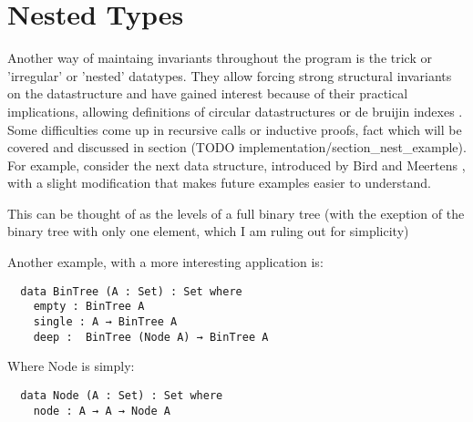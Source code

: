 \documentclass[12pt,twoside,notitlepage]{report}
\newcommand{\Conid}[1]{\mathit{#1}}
\newcommand{\Varid}[1]{\mathit{#1}}
\def\resethooks{%
  \global\let\SaveRestoreHook\empty
  \global\let\ColumnHook\empty}
\newcommand{\hsindent}[1]{\quad}%
\let\hspre\empty
\let\hspost\empty
\begin{document}
\section{Nested Types}

Another way of maintaing invariants throughout the program is the trick or 'irregular'
or 'nested' datatypes. They allow forcing strong structural invariants on the datastructure
and have gained interest because of their practical implications, allowing definitions of
circular datastructures \cite{circular} or de bruijin indexes \cite{birdmeertens}.
Some difficulties come up in recursive calls or inductive proofs, fact which will be
covered and discussed in section (TODO implementation/section\_nest\_example).
For example, consider the next data structure, introduced by Bird and Meertens \cite{birdmeertens}
, with a slight modification that makes future examples easier to understand.

\resethooks

This can be thought of as the levels of a full binary tree (with the exeption of the binary tree with only
one element, which I am ruling out for simplicity)


Another example, with a more interesting application is:

\begin{verbatim}
  data BinTree (A : Set) : Set where
    empty : BinTree A
    single : A → BinTree A
    deep :  BinTree (Node A) → BinTree A
\end{verbatim}
Where Node is simply:
\begin{verbatim}
  data Node (A : Set) : Set where
    node : A → A → Node A
\end{verbatim}
\end{document}
